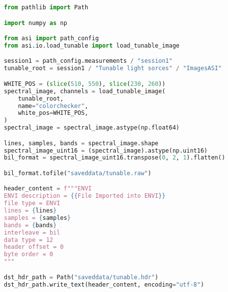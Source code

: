 \begin{lstlisting}[language=python, caption=Save tunable image as ENVI format, label={code:save-tunable}]
from pathlib import Path

import numpy as np

from asi import path_config
from asi.io.load_tunable import load_tunable_image

session1 = path_config.measurements / "session1"
tunable_root = session1 / "Tunable light sorces" / "ImagesASI"

WHITE_POS = (slice(510, 550), slice(230, 260))
spectral_image, channels = load_tunable_image(
    tunable_root,
    name="colorchecker",
    white_pos=WHITE_POS,
)
spectral_image = spectral_image.astype(np.float64)

lines, samples, bands = spectral_image.shape
spectral_image_uint16 = (spectral_image).astype(np.uint16)
bil_format = spectral_image_uint16.transpose(0, 2, 1).flatten()

bil_format.tofile("saveddata/tunable.raw")

header_content = f"""ENVI
ENVI description = {{File Imported into ENVI}}
file type = ENVI
lines = {lines}
samples = {samples}
bands = {bands}
interleave = bil
data type = 12
header offset = 0
byte order = 0
"""

dst_hdr_path = Path("saveddata/tunable.hdr")
dst_hdr_path.write_text(header_content, encoding="utf-8")
\end{lstlisting}